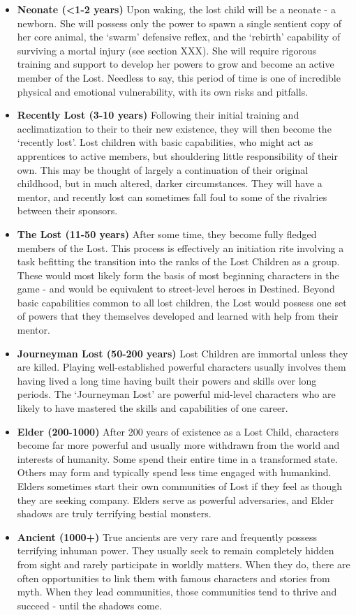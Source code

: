 \documentclass[letterpaper,serif]{rpg-module}
\begin{document}
\begin{itemize}
    \item \textbf{Neonate (<1-2 years)}
    Upon waking, the lost child will be a neonate - a newborn. She will possess only the power to spawn a single sentient copy of her core animal, the `swarm' defensive reflex, and the `rebirth' capability of surviving a mortal injury (see section XXX). She will require rigorous training and support to develop her powers to grow and become an active member of the Lost. Needless to say, this period of time is one of incredible physical and emotional vulnerability, with its own risks and pitfalls. 
    \item \textbf{Recently Lost (3-10 years)} Following their initial training and acclimatization to their  to their new existence, they will then become the `recently lost'. Lost children with basic capabilities, who might act as apprentices to active members, but shouldering little responsibility of their own. This may be thought of largely a continuation of their original childhood, but in much altered, darker circumstances. They will have a mentor, and recently lost can sometimes fall foul to some of the rivalries between their sponsors. 
    \item \textbf{The Lost (11-50 years)} After some time, they become fully fledged members of the Lost. This process is effectively an initiation rite involving a task befitting the transition into the ranks of the Lost Children as a group. These would most likely form the basis of most beginning characters in the game - and would be equivalent to street-level heroes in Destined. Beyond basic capabilities common to all lost children, the Lost would possess one set of powers that they themselves developed and learned with help from their mentor. 
    \item \textbf{Journeyman Lost (50-200 years)} Lost Children are immortal unless they are killed. Playing well-established powerful characters usually involves them having lived a long time having built their powers and skills over long periods. The `Journeyman Lost' are powerful mid-level characters who are likely to have mastered the skills and capabilities of one career.  
    \item \textbf{Elder (200-1000)} After 200 years of existence as a Lost Child, characters become far more powerful and usually more withdrawn from the world and interests of humanity. Some spend their entire time in a transformed state. Others may form and typically spend less time engaged with humankind. Elders sometimes start their own communities of Lost if they feel as though they are seeking company. Elders serve as powerful adversaries, and Elder shadows are truly terrifying bestial monsters. 
    \item \textbf{Ancient (1000+)} True ancients are very rare and frequently possess terrifying inhuman power. They usually seek to remain completely hidden from sight and rarely participate in worldly matters. When they do, there are often opportunities to link them with famous characters and stories from myth. When they lead communities, those communities tend to thrive and succeed - until the shadows come. 
\end{itemize}
\end{document}
